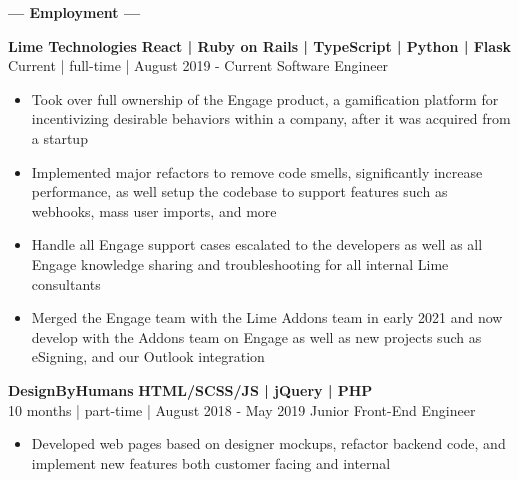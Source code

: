 \documentclass[12pt]{article}
\begin{document}
    \begin{center}
    \textbf{\Large --- Employment ---}\\
    \end{center}
    \vspace{-2mm}
    \begin{footnotesize}
    \flushleft
    \textbf{\color{primary}\large Lime Technologies} \hfill \textbf{\color{Cerulean}React | Ruby on Rails | TypeScript | Python | Flask }\\ 
    {\color{primary}Current | full-time | August 2019 - Current} \hfill {\color{Cerulean} Software Engineer}
    \vspace{-1mm}
    \begin{itemize}
        \setlength{\itemsep}{0pt}
        \item Took over full ownership of the Engage product, a gamification platform for incentivizing desirable behaviors within a company, after it was acquired from a startup
        \item Implemented major refactors to remove code smells, significantly increase performance, as well setup the codebase to support features such as webhooks, mass user imports, and more
        \item Handle all Engage support cases escalated to the developers as well as all Engage knowledge sharing and troubleshooting for all internal Lime consultants
        \item Merged the Engage team with the Lime Addons team in early 2021 and now develop with the Addons team on Engage as well as new projects such as eSigning, and our Outlook integration
    \end{itemize}
    
    \flushleft
    
    \textbf{\color{primary}\large DesignByHumans} \hfill \textbf{\color{Cerulean}HTML/SCSS/JS | jQuery | PHP}\\ 
    {\color{primary}10 months | part-time | August 2018 - May 2019} \hfill {\color{Cerulean} Junior Front-End Engineer}
    \vspace{-1mm}
    \begin{itemize}
        \setlength{\itemsep}{0pt}
        \item Developed web pages based on designer mockups, refactor backend code, and implement new features both customer facing and internal
    \end{itemize}
    \end{footnotesize}
    
\end{document}
